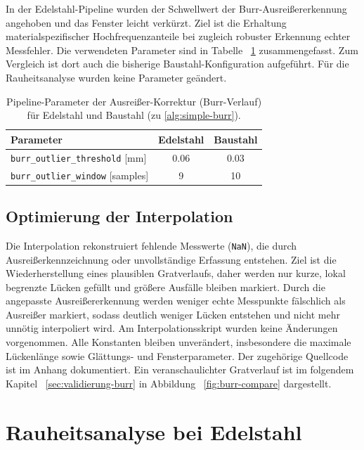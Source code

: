 In der Edelstahl-Pipeline wurden der Schwellwert der Burr-Ausreißererkennung angehoben und das Fenster leicht verkürzt. Ziel ist die Erhaltung materialspezifischer Hochfrequenzanteile bei zugleich robuster Erkennung echter Messfehler. Die verwendeten Parameter sind in Tabelle ~\ref{tab:params-outlier} zusammengefasst. Zum Vergleich ist dort auch die bisherige Baustahl-Konfiguration aufgeführt. Für die Rauheitsanalyse wurden keine Parameter geändert.

\begin{table}[h!]
    \centering
    \caption{Pipeline-Parameter der Ausreißer-Korrektur (Burr-Verlauf) für Edelstahl und Baustahl (zu \cref{alg:simple-burr}).}
    \label{tab:params-outlier}
    \begin{tabular}{lcc}
        \hline
        \textbf{Parameter} & \textbf{Edelstahl} & \textbf{Baustahl} \\
        \hline
        \texttt{burr\_outlier\_threshold} [mm]   & 0.06 & 0.03 \\
        \texttt{burr\_outlier\_window} [samples] & 9    & 10   \\
        \hline
    \end{tabular}
\end{table}

\subsection{Optimierung der Interpolation}
\label{sec:Interpolation}

Die Interpolation rekonstruiert fehlende Messwerte (\texttt{NaN}), die durch Ausreißerkennzeichnung oder unvollständige Erfassung entstehen. Ziel ist die Wiederherstellung eines plausiblen Gratverlaufs, daher werden nur kurze, lokal begrenzte Lücken gefüllt und größere Ausfälle bleiben markiert. Durch die angepasste Ausreißererkennung werden weniger echte Messpunkte fälschlich als Ausreißer markiert, sodass deutlich weniger Lücken entstehen und nicht mehr unnötig interpoliert wird. Am Interpolationsskript wurden keine Änderungen vorgenommen. Alle Konstanten bleiben unverändert, insbesondere die maximale Lückenlänge sowie Glättungs- und Fensterparameter. Der zugehörige Quellcode ist im Anhang dokumentiert. Ein veranschaulichter Gratverlauf ist im folgendem Kapitel ~\ref{sec:validierung-burr} in Abbildung ~\ref{fig:burr-compare} dargestellt.

\section{Rauheitsanalyse bei Edelstahl}
\label{sec:roughness-analysis}

